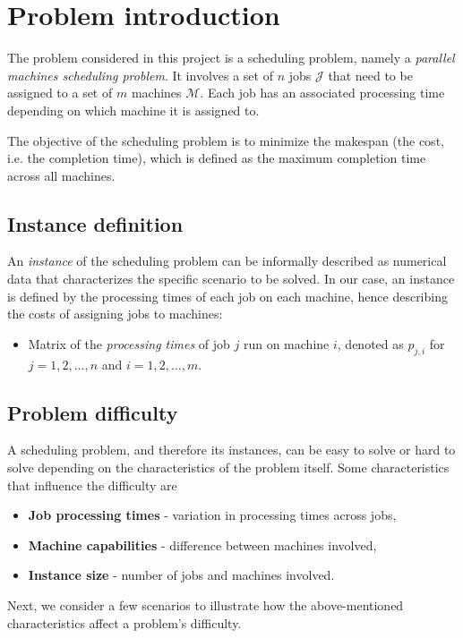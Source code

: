 \section{Problem introduction}
The problem considered in this project is a scheduling problem, namely a \emph{parallel machines scheduling problem}.
It involves a set of $n$ jobs $\mathcal{J}$ that need to be assigned to a set of $m$ machines $\mathcal{M}$.
Each job has an associated processing time depending on which machine it is assigned to.

The objective of the scheduling problem is to minimize the makespan (the cost, i.e. the completion time), which is defined as the maximum completion time across all machines.


\subsection{Instance definition}
An \emph{instance} of the scheduling problem can be informally described as numerical data that characterizes the specific scenario to be solved.
In our case, an instance is defined by the processing times of each job on each machine, hence describing the costs of assigning jobs to machines:
\begin{itemize}
  \item Matrix of the \emph{processing times} of job $j$ run on machine $i$, denoted as $p_{j,i}$ for $j = 1, 2, \ldots, n$ and $i = 1, 2, \ldots, m$.
\end{itemize}


\subsection{Problem difficulty}
A scheduling problem, and therefore its instances, can be easy to solve or hard to solve depending on the characteristics of the problem itself.
Some characteristics that influence the difficulty are
\begin{itemize}
  \item \textbf{Job processing times} - variation in processing times across jobs,
  \item \textbf{Machine capabilities} - difference between machines involved,
  \item \textbf{Instance size} - number of jobs and machines involved.
\end{itemize}
Next, we consider a few scenarios to illustrate how the above-mentioned characteristics affect a problem's difficulty.


